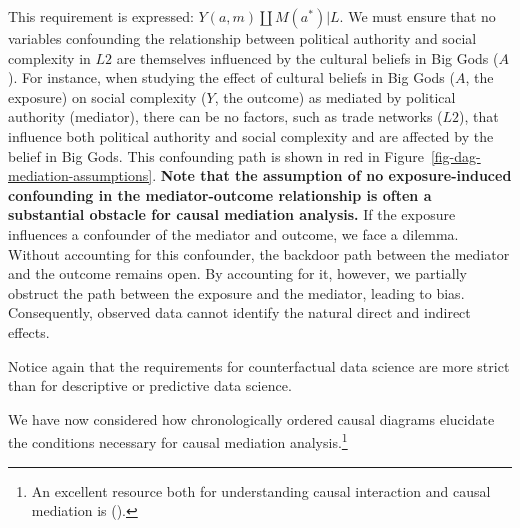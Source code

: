 \documentclass[
  singlecolumn,
  9pt]{article}
\begin{document}
This requirement is expressed: \(Y(a,m) \coprod M(a^*) | L\). We must
ensure that no variables confounding the relationship between political
authority and social complexity in \(L2\) are themselves influenced by
the cultural beliefs in Big Gods (\(A\)). For instance, when studying
the effect of cultural beliefs in Big Gods (\(A\), the exposure) on
social complexity (\(Y\), the outcome) as mediated by political
authority (mediator), there can be no factors, such as trade networks
(\(L2\)), that influence both political authority and social complexity
and are affected by the belief in Big Gods. This confounding path is
shown in red in Figure~\ref{fig-dag-mediation-assumptions}. \textbf{Note
that the assumption of no exposure-induced confounding in the
mediator-outcome relationship is often a substantial obstacle for causal
mediation analysis.} If the exposure influences a confounder of the
mediator and outcome, we face a dilemma. Without accounting for this
confounder, the backdoor path between the mediator and the outcome
remains open. By accounting for it, however, we partially obstruct the
path between the exposure and the mediator, leading to bias.
Consequently, observed data cannot identify the natural direct and
indirect effects.

Notice again that the requirements for counterfactual data science are
more strict than for descriptive or predictive data science.

We have now considered how chronologically ordered causal diagrams
elucidate the conditions necessary for causal mediation
analysis.\footnote{An excellent resource both for understanding causal
  interaction and causal mediation is
  ().}
\end{document}
